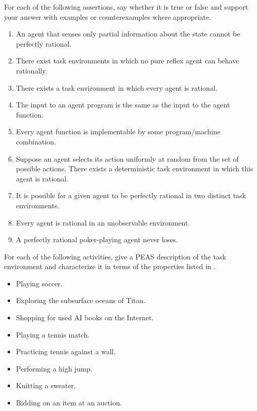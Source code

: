 \begin{exercise}
For each of the following assertions, say whether it is true or false and support your answer with examples or counterexamples where appropriate.
\begin{enumerate}
\item An agent that senses only partial information about the state cannot be perfectly rational.
\item There exist task environments in which no pure reflex agent can behave rationally.
\item There exists a task environment in which every agent is rational.
\item The input to an agent program is the same as the input to the agent function.
\item Every agent function is implementable by some program/machine combination.
\item Suppose an agent selects its action uniformly at random from the set of possible actions. There exists a deterministic task environment in which this agent is rational.
\item It is possible for a given agent to be perfectly rational in two distinct task environments.
\item Every agent is rational in an unobservable environment.
\item A perfectly rational poker-playing agent never loses.
\end{enumerate}
\end{exercise} 

\begin{uexercise}
For each of the following activities, give a PEAS description of the task environment and characterize it in terms of the properties 
listed in . 
\begin{itemize}
\item Playing soccer.
\item Exploring the subsurface oceans of Titan.
\item Shopping for used AI books on the Internet.
\item Playing a tennis match.
\item Practicing tennis against a wall.
\item Performing a high jump.
\item Knitting a sweater.
\item Bidding on an item at an auction.
\end{itemize}
\end{uexercise} 

